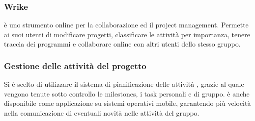 \subsubsection{Wrike}
 è uno strumento online per la collaborazione ed il project management. Permette ai suoi utenti di modificare progetti, classificare le attività per importanza, tenere traccia dei programmi e collaborare online con altri utenti dello stesso gruppo. 

\subsubsection{Gestione delle attività del progetto}
Si è scelto di utilizzare il sistema di pianificazione delle attività , grazie al quale vengono tenute sotto controllo le milestones, i task personali e di gruppo.  è anche disponibile come applicazione su sistemi operativi mobile, garantendo più velocità nella comunicazione di eventuali novità nelle attività del gruppo.

